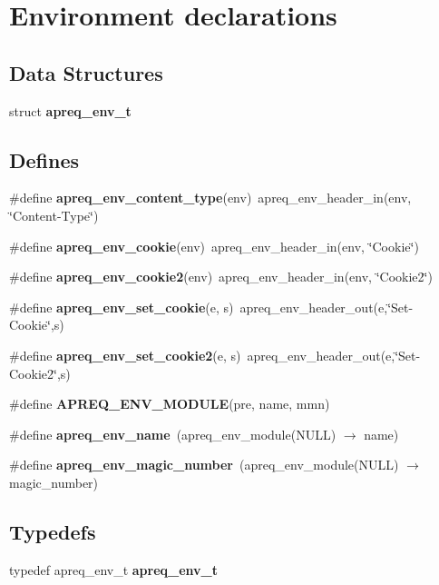 \section{Environment declarations}
\label{group__ENV}
\subsection*{Data Structures}
\begin{CompactItemize}
\item 
struct {\bf apreq\_\-env\_\-t}
\end{CompactItemize}
\subsection*{Defines}
\begin{CompactItemize}
\item 
\#define {\bf apreq\_\-env\_\-content\_\-type}(env)\ apreq\_\-env\_\-header\_\-in(env, \char`\"{}Content-Type\char`\"{})
\item 
\#define {\bf apreq\_\-env\_\-cookie}(env)\ apreq\_\-env\_\-header\_\-in(env, \char`\"{}Cookie\char`\"{})
\item 
\#define {\bf apreq\_\-env\_\-cookie2}(env)\ apreq\_\-env\_\-header\_\-in(env, \char`\"{}Cookie2\char`\"{})
\item 
\#define {\bf apreq\_\-env\_\-set\_\-cookie}(e, s)\ apreq\_\-env\_\-header\_\-out(e,\char`\"{}Set-Cookie\char`\"{},s)
\item 
\#define {\bf apreq\_\-env\_\-set\_\-cookie2}(e, s)\ apreq\_\-env\_\-header\_\-out(e,\char`\"{}Set-Cookie2\char`\"{},s)
\item 
\#define {\bf APREQ\_\-ENV\_\-MODULE}(pre, name, mmn)
\item 
\#define {\bf apreq\_\-env\_\-name}\ (apreq\_\-env\_\-module(NULL) $\rightarrow$ name)
\item 
\#define {\bf apreq\_\-env\_\-magic\_\-number}\ (apreq\_\-env\_\-module(NULL) $\rightarrow$ magic\_\-number)
\end{CompactItemize}
\subsection*{Typedefs}
\begin{CompactItemize}
\item 
typedef apreq\_\-env\_\-t {\bf apreq\_\-env\_\-t}
\end{CompactItemize}
